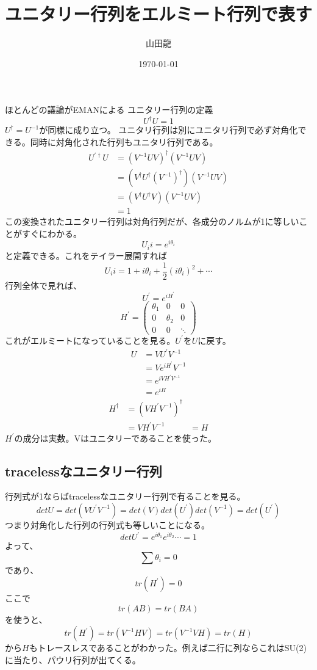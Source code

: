 \documentclass[twocolumn]{jsarticle}
\date{\today}
\author{山田龍}
\title{ユニタリー行列をエルミート行列で表す}
\newcommand{\half}{\frac{1}{2}}
\newcommand{\beq}{\begin{equation}}
\newcommand{\eeq}{\end{equation}}
\begin{document}
\maketitle
\section{}
ほとんどの議論がEMANによる
ユニタリー行列の定義
\beq
    U^\dagger U = 1
\eeq
$U^\dagger = U^{-1}$が同様に成り立つ。
ユニタリ行列は別にユニタリ行列で必ず対角化できる。同時に対角化された行列もユニタリ行列である。
\begin{align}
    U^{\prime \dagger} U &= (V^{-1}UV)^{\dagger}(V^{-1}UV)\\
                         &= (V^{\dagger}U^{\dagger}(V^{-1})^{\dagger})(V^{-1}UV)\\
            &= (V^{\dagger}U^{\dagger}V)(V^{-1}UV)\\
            &= 1
\end{align}
この変換されたユニタリー行列は対角行列だが、各成分のノルムが1に等しいことがすぐにわかる。
\beq
    U_ii = e^{i\theta_i}
\eeq
と定義できる。これをテイラー展開すれば
\beq
U_ii = 1 + i\theta_i + \half (i\theta_i)^2 + \cdots
\eeq
行列全体で見れば、
\beq
    U^\prime = e^{iH^\prime}
\eeq
\beq
H^\prime
= \left(
        \begin{array}{ccc}
                  \theta_1 & 0 & 0 \\
                        0 & \theta_2 & 0 \\
                              0 & 0 & \ddots
        \end{array}
    \right)
\eeq
これがエルミートになっていることを見る。$U^{\prime}$を$U$に戻す。
\begin{align}
    U &= V U^\prime V^{-1}\\
      &= V e^{iH^\prime}V^{-1}\\
    &= e^{iVH^\prime V^{-1}}\\
    &= e^{iH}
\end{align}
\begin{align}
    H^\dagger &= (VH^\prime V^{-1})^\dagger\\
              &= VH^\prime V^{-1}
              &= H
\end{align}
$H^\prime$の成分は実数。Vはユニタリーであることを使った。
\subsection{tracelessなユニタリー行列}
行列式が1ならばtracelessなユニタリー行列で有ることを見る。
\beq
det U = det (V U^\prime V^{-1}) = det(V)det(U^\prime)det(V^{-1}) = det (U^\prime)
\eeq
つまり対角化した行列の行列式も等しいことになる。
\beq
    det U^\prime =  e^{i\theta_1}e^{i\theta_2}\cdots = 1
\eeq
よって、
\beq
    \sum \theta_i = 0
\eeq
であり、
\beq
    tr(H^\prime) = 0
\eeq
ここで
\beq
    tr(AB) = tr(BA)
\eeq
を使うと、
\beq
    tr(H^\prime) = tr(V^{-1} H V) = tr(V^{-1} V H) = tr(H)
\eeq
から$H$もトレースレスであることがわかった。例えば二行に列ならこれはSU(2)に当たり、パウリ行列が出てくる。
\end{document}
